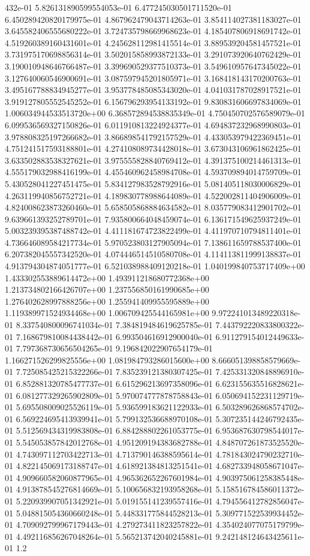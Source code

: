 432e-01	5.826131890599554053e-01	6.477245030501711520e-01	6.450289420820179975e-01	4.867962479043714263e-01	3.854114027381183027e-01	3.645582406555680222e-01	3.724735798669968623e-01	4.185407806918691742e-01	4.519260389160431601e-01	4.245628112981415514e-01	3.889539204581457521e-01	3.731975170698856314e-01	3.502015858993872133e-01	3.291073920640762429e-01	3.190010948646766487e-01	3.399690529377510373e-01	3.549610957647345022e-01	3.127640060546900691e-01	3.087597945201805971e-01	3.168418143170200763e-01	3.495167788834945277e-01	3.953778485085343020e-01	4.041031787028917521e-01	3.919127805552545252e-01	6.156796293954133192e-01	9.830831606697834069e-01	1.006034944533513720e+00	6.368572894538835349e-01	4.750450702576589079e-01	6.099536569327150826e-01	6.011910813224924377e-01	4.694837232968990803e-01	3.978808325197266682e-01	3.866898541792157529e-01	4.433053979422369451e-01	4.751241517593188801e-01	4.274108089734428018e-01	3.673043106961862425e-01	3.633502883538327621e-01	3.975555828840769412e-01	4.391375100214461313e-01	4.555179032988416199e-01	4.455460962458984708e-01	4.593709894014759709e-01	5.430528041227451475e-01	5.834127983528792916e-01	5.081405118030006829e-01	4.263119940856752721e-01	4.189830778988644089e-01	4.522002811404906009e-01	4.824008623873260460e-01	5.658505868884634582e-01	8.035779083412901702e-01	9.639661393252789701e-01	7.935800664048459074e-01	6.136171549625937249e-01	5.003239395387488742e-01	4.411181674723822499e-01	4.411970710794811401e-01	4.736646089584217734e-01	5.970523803127905094e-01	7.138611659788537400e-01	6.207382045557342520e-01	4.074446514510580708e-01	4.114113811999138837e-01	4.913794304874051777e-01	6.521038988409120218e-01	1.040199840753717409e+00	1.433302553889614472e+00	1.493911218680772368e+00	1.213734802166426707e+00	1.237556850161990685e+00	1.276402628997888256e+00	1.255941409955595889e+00	1.119389971524934468e+00	1.006709425544165981e+00	9.972241013489220318e-01	8.337540800096741034e-01	7.384819484619625785e-01	7.443792220833800322e-01	7.168679810084438442e-01	6.993504616912900040e-01	6.911279154012449633e-01	7.797368730656504265e-01	9.196842022907654179e-01	1.166271526299825556e+00	1.081984793286015600e+00	8.666051398858579669e-01	7.725085425215322266e-01	7.835239121380307425e-01	7.425331320848896910e-01	6.852881320785477737e-01	6.615296213697358096e-01	6.623155635516828621e-01	6.081277329265902809e-01	5.970074777878758843e-01	6.050694152231129719e-01	5.695508009025526119e-01	5.936599183621122933e-01	6.503289626868574702e-01	6.569224695413939941e-01	5.799132536688970108e-01	5.307235144246792435e-01	5.512569434319983808e-01	6.884288802261053775e-01	6.953687630798544017e-01	5.545053857842012768e-01	4.951209194383682788e-01	4.848707261873525520e-01	4.743097112703422713e-01	4.713790146388595614e-01	4.781843024790232710e-01	4.822145069173188747e-01	4.618921384813251541e-01	4.682733948058671047e-01	4.909660582060877965e-01	4.965362652267601984e-01	4.903975061258385448e-01	4.913878545276814669e-01	5.100656832193958268e-01	5.158516784586011372e-01	5.220939907051342921e-01	5.019155141239557416e-01	4.794556412782856047e-01	5.048815054360660248e-01	5.448331775844528213e-01	5.309771522539934452e-01	4.709092799967179443e-01	4.279273411823257822e-01	4.354024077075179799e-01	4.492116856267048264e-01	5.565213742040245881e-01	9.242148124643425611e-01	1.2